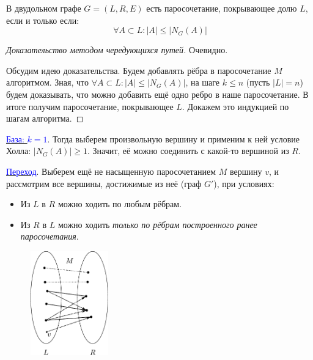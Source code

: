 \begin{frame}[t]
    \begin{theorem}[P.Hall, 1935]
        В двудольном графе $G = \left( L, R, E \right) $ есть паросочетание, покрывающее долю $L$, если и только если:  $$\forall A \subset L: |A| \leq |N_G(A)|$$
    \end{theorem}
    
    \begin{proof}[Доказательство методом чередующихся путей]
        \fbox{$ \Rightarrow $} Очевидно.
        
        \fbox{$ \Leftarrow $} Обсудим идею доказательства. Будем добавлять рёбра в паросочетание $M$ алгоритмом. Зная, что $\forall A \subset L: |A| \leq |N_G(A)|$, на шаге $k \leq n$ (пусть $|L| = n$) будем доказывать, что можно добавить ещё одно ребро в наше паросочетание. В итоге получим паросочетание, покрывающее $L$. Докажем это индукцией по шагам алгоритма.
    \end{proof}
\end{frame}

\begin{frame}[t]
    \small
    \underline{\textcolor{blue}{База: $k = 1$}}. Тогда выберем произвольную вершину и применим к ней условие Холла:  $|N_G (A)| \geq 1$. Значит, её можно соединить с какой-то вершиной из $R$.
    
    \underline{\textcolor{blue}{Переход}}. Выберем ещё не насыщенную паросочетанием $M$ вершину $v$, и рассмотрим все вершины, достижимые из неё (граф $G'$), при условиях:
     \begin{itemize}
        \item Из $L$ в $R$ можно ходить по любым рёбрам.
        \item Из $R$ в $L$ можно ходить \textit{только по рёбрам построенного ранее паросочетания}.
    \end{itemize}

    \begin{figure}[h]
        \centering
        \includegraphics[width=0.3\textwidth]{images/condition}
    \end{figure}
    
\end{frame}

